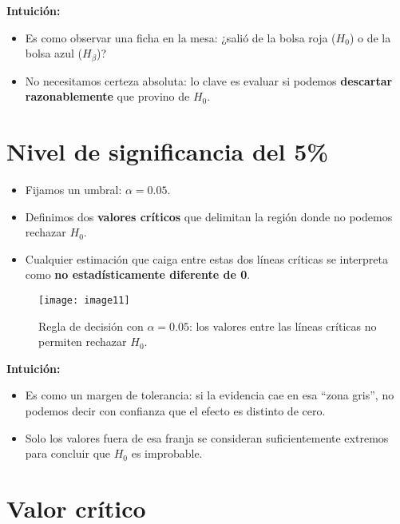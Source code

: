 \documentclass[12pt]{article}
\begin{document}
\textbf{Intuición:}
\begin{itemize}
    \item Es como observar una ficha en la mesa: ¿salió de la bolsa roja ($H_0$) o de la bolsa azul ($H_\beta$)?  
    \item No necesitamos certeza absoluta: lo clave es evaluar si podemos \textbf{descartar razonablemente} que provino de $H_0$.  
\end{itemize}


\section*{\noindent\textbf{Nivel de significancia del 5\%}}

\begin{itemize}
    \item Fijamos un umbral: $\alpha = 0.05$.  
    \item Definimos dos \textbf{valores críticos} que delimitan la región donde no podemos rechazar $H_0$.  
    \item Cualquier estimación que caiga entre estas dos líneas críticas se interpreta como \textbf{no estadísticamente diferente de 0}.  
\end{itemize}

\begin{figure}[H]
\centering
\texttt{[image: image11]}
\caption{\footnotesize Regla de decisión con $\alpha = 0.05$: los valores entre las líneas críticas no permiten rechazar $H_0$.}
\end{figure}

\textbf{Intuición:}
\begin{itemize}
    \item Es como un margen de tolerancia: si la evidencia cae en esa “zona gris”, no podemos decir con confianza que el efecto es distinto de cero.  
    \item Solo los valores fuera de esa franja se consideran suficientemente extremos para concluir que $H_0$ es improbable.  
\end{itemize}

\section*{\noindent\textbf{Valor crítico}}
\end{document}
